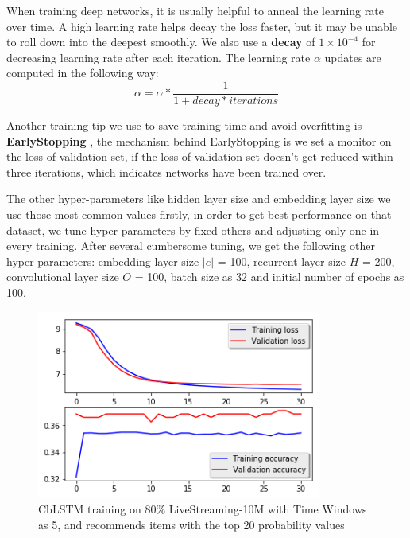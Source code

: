 \documentclass[runningheads]{llncs}
\begin{document}
When training deep networks, it is usually helpful to anneal the learning rate over time. A high learning rate helps decay the loss faster, but it may be unable to roll down into the deepest smoothly. We also use a \textbf{decay} \cite{22} of $1\times 10^{-4}$ for decreasing learning rate after each iteration. The learning rate $\alpha$ updates are computed in the following way:
\begin{equation}
\alpha = \alpha * \frac{1}{1 + decay * iterations}
\end{equation}

Another training tip we use to save training time and avoid overfitting is \textbf{EarlyStopping} \cite{22}, the mechanism behind EarlyStopping is we set a monitor on the loss of validation set, if the loss of validation set doesn't get reduced within three iterations, which indicates networks have been trained over.

The other hyper-parameters like hidden layer size and embedding layer size we use those most common values firstly,
in order to get best performance on that dataset, we tune hyper-parameters by fixed others and adjusting only one in every training. After several cumbersome tuning, we get the following other hyper-parameters: embedding layer size $|e|$ = 100, recurrent layer size $H$ = 200, convolutional layer size $O$ = 100, batch size as 32 and initial number of epochs as 100.
\begin{figure}[htbp]
\centerline
{\includegraphics[height=6.2cm]{10thousand@6.png}}
\caption{CbLSTM training on 80\% LiveStreaming-10M with Time Windows as 5, and recommends items with the top 20 probability values}
\label{fig}
\end{figure}
\end{document}
